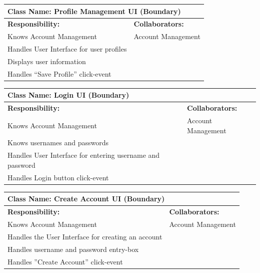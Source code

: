 \documentclass[]{article}
\begin{document}
\begin{table}[ht]
	\centering
	\begin{tabular}{|p{7cm}|p{7cm}|}
		\hline
		\multicolumn{2}{|l|}{\textbf{Class Name:} Profile Management UI (Boundary)}             \\
		\hline
		\textbf{Responsibility:}                             & \textbf{Collaborators:}  \\
		\hline
		Knows Account Management							 & Account Management         \\
		Handles User Interface for user profiles 			 &                            \\
		Displays user information							 &                            \\
		Handles “Save Profile” click-event 					 &                            \\

		\hline
	\end{tabular}
\end{table}

\begin{table}[ht]
	\centering
	\begin{tabular}{|p{7cm}|p{7cm}|}
		\hline
		\multicolumn{2}{|l|}{\textbf{Class Name:} Login UI (Boundary)}             \\
		\hline
		\textbf{Responsibility:}                                  & \textbf{Collaborators:}  \\
		\hline
		Knows Account Management							      & Account Management         \\
		Knows usernames and passwords						   	  &                            \\
		Handles User Interface for entering username and password &                            \\
		Handles Login button click-event  					   	  &                            \\

		\hline
	\end{tabular}
\end{table}

\begin{table}[ht]
	\centering
	\begin{tabular}{|p{7cm}|p{7cm}|}
		\hline
		\multicolumn{2}{|l|}{\textbf{Class Name:} Create Account UI (Boundary)}             \\
		\hline
		\textbf{Responsibility:}                             & \textbf{Collaborators:}  \\
		\hline
		Knows Account Management							 & Account Management         \\
		Handles the User Interface for creating an account	 &                            \\
		Handles username and password entry-box 			 &                            \\
		Handles ”Create Account” click-event 				 &                            \\

		\hline
	\end{tabular}
\end{table}
\end{document}

